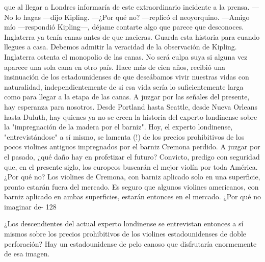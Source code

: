 que al llegar a Londres informaría de este extraordinario incidente a la prensa. —No lo hagas —dijo Kipling. —¿Por qué no? —replicó el neoyorquino. —Amigo mío —respondió Kipling—, déjame contarte algo que parece que desconoces. Inglaterra ya tenía canas antes de que nacieras. Guarda esta historia para cuando llegues a casa.
Debemos admitir la veracidad de la observación de Kipling. Inglaterra ostenta el monopolio de las canas. No será culpa suya si alguna vez aparece una sola cana en otro país. Hace más de cien años, recibió una insinuación de los estadounidenses de que deseábamos vivir nuestras vidas con naturalidad, independientemente de si esa vida sería lo suficientemente larga como para llegar a la etapa de las canas. A juzgar por las señales del presente, hay esperanza para nosotros. Desde Portland hasta Seattle, desde Nueva Orleans hasta Duluth, hay quienes ya no se creen la historia del experto londinense sobre la "impregnación de la madera por el barniz". Hoy, el experto londinense, "entrevistándose" a sí mismo, se lamenta (!) de los precios prohibitivos de los pocos violines antiguos impregnados por el barniz Cremona perdido. A juzgar por el pasado, ¿qué daño hay en profetizar el futuro? Convicto, predigo con seguridad que, en el presente siglo, los europeos buscarán el mejor violín por toda América.
¿Por qué no?
Los violines de Cremona, con barniz aplicado solo en una superficie, pronto estarán fuera del mercado. Es seguro que algunos violines americanos, con barniz aplicado en ambas superficies, estarán entonces en el mercado. ¿Por qué no imaginar de-
128

¿Los descendientes del actual experto londinense se entrevistan entonces a sí mismos sobre los precios prohibitivos de los violines estadounidenses de doble perforación? Hay un estadounidense de pelo canoso que disfrutaría enormemente de esa imagen.
